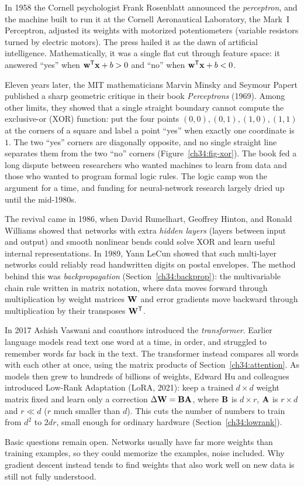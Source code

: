 \begin{historybox}
In 1958 the Cornell psychologist Frank Rosenblatt announced the \emph{perceptron}, and
the machine built to run it at the Cornell Aeronautical Laboratory, the Mark~I Perceptron,
adjusted its weights with motorized potentiometers (variable resistors turned by electric
motors). The press hailed it as the dawn of artificial intelligence. Mathematically, it
was a single flat cut through feature space: it answered ``yes'' when
$\mathbf{w}^{\mathsf{T}}\mathbf{x} + b > 0$ and ``no'' when $\mathbf{w}^{\mathsf{T}}\mathbf{x} + b < 0$.

Eleven years later, the MIT mathematicians Marvin Minsky and Seymour Papert published a
sharp geometric critique in their book \emph{Perceptrons} (1969). Among other limits, they
showed that a single straight boundary cannot compute the exclusive-or ($\mathrm{XOR}$)
function: put the four points $(0,0),(0,1),(1,0),(1,1)$ at the corners of a square and
label a point ``yes'' when exactly one coordinate is $1$. The two ``yes'' corners are
diagonally opposite, and no single straight line separates them from the two ``no''
corners (Figure~\ref{ch34:fig-xor}). The book fed a long dispute between researchers who wanted machines to learn
from data and those who wanted to program formal logic rules. The logic camp won the
argument for a time, and funding for neural-network research largely dried up until the
mid-1980s.

The revival came in 1986, when David Rumelhart, Geoffrey Hinton, and Ronald Williams
showed that networks with extra \emph{hidden layers} (layers between input and output)
and smooth nonlinear bends could solve XOR and learn useful internal representations. In
1989, Yann LeCun showed that such multi-layer networks could reliably read handwritten
digits on postal envelopes. The method behind this was \emph{backpropagation}
(Section~\ref{ch34:backprop}): the multivariable chain rule written in matrix notation,
where data moves forward through multiplication by weight matrices $\mathbf{W}$ and error
gradients move backward through multiplication by their transposes $\mathbf{W}^{\mathsf{T}}$.

In 2017 Ashish Vaswani and coauthors introduced the \emph{transformer}. Earlier language
models read text one word at a time, in order, and struggled to remember words far back
in the text. The transformer instead compares all words with each other at once, using
the matrix products of Section~\ref{ch34:attention}. As models then grew to hundreds of
billions of weights, Edward Hu and colleagues introduced Low-Rank Adaptation (LoRA, 2021):
keep a trained $d\times d$ weight matrix fixed and learn only a correction
$\Delta\mathbf{W} = \mathbf{B}\mathbf{A}$, where $\mathbf{B}$ is $d\times r$, $\mathbf{A}$ is $r\times d$
and $r \ll d$ ($r$ much smaller than $d$). This cuts the number of numbers to train from
$d^2$ to $2dr$, small enough for ordinary hardware (Section~\ref{ch34:lowrank}).

Basic questions remain open. Networks usually have far more weights than training
examples, so they could memorize the examples, noise included. Why gradient descent
instead tends to find weights that also work well on new data is still not fully
understood.
\end{historybox}

